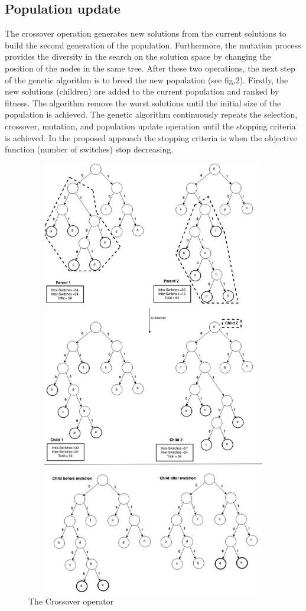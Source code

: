 \documentclass[preprint,12pt]{elsarticle}
\begin{document}
\subsection{Population update}
The crossover operation generates new solutions from the current solutions to build the second generation of the population. Furthermore, the mutation process provides the diversity in the search on the solution space by changing the position of the nodes in the same tree. After these two operations, the next step of the genetic algorithm is to breed the new population (see fig.2). Firstly, the new solutions (children) are added to the current population and ranked by fitness. The algorithm remove the worst solutions until the initial size of the population is achieved. The genetic algorithm  continuously repeats the selection, crossover, mutation, and population update operation until the stopping criteria is achieved. In the proposed approach the stopping criteria is when the objective function (number of switches) stop decreasing.
\begin{figure}[tbph]
\begin{center}
\includegraphics[width=400pt,height=545pt]{Images/Drawing1-1.jpg}
\caption{The Crossover operator}
\end{center}
\label{Fig1}
\end{figure}
\end{document}
